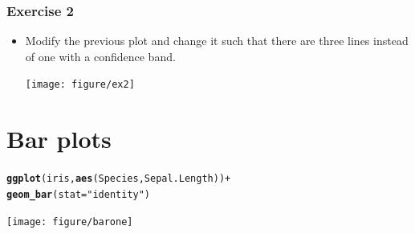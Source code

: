 \documentclass{beamer}\usepackage[]{graphicx}\usepackage[]{color}
\makeatletter
\newcommand{\hlstr}[1]{\textcolor[rgb]{0.192,0.494,0.8}{#1}}%
\newcommand{\hlopt}[1]{\textcolor[rgb]{0,0,0}{#1}}%
\newcommand{\hlstd}[1]{\textcolor[rgb]{0.345,0.345,0.345}{#1}}%
\newcommand{\hlkwc}[1]{\textcolor[rgb]{0.333,0.667,0.333}{#1}}%
\newcommand{\hlkwd}[1]{\textcolor[rgb]{0.737,0.353,0.396}{\textbf{#1}}}%
\newenvironment{kframe}{%
 \def\at@end@of@kframe{}%
 \ifinner\ifhmode%
  \def\at@end@of@kframe{\end{minipage}}%
  \begin{minipage}{\columnwidth}%
 \fi\fi%
 \def\FrameCommand##1{\hskip\@totalleftmargin \hskip-\fboxsep
 \colorbox{shadecolor}{##1}\hskip-\fboxsep
     \hskip-\linewidth \hskip-\@totalleftmargin \hskip\columnwidth}%
 \MakeFramed {\advance\hsize-\width
   \@totalleftmargin\z@ \linewidth\hsize
   \@setminipage}}%
 {\par\unskip\endMakeFramed%
 \at@end@of@kframe}
\newenvironment{knitrout}{}{} %
\makeatother
\begin{document}

\begin{frame}[fragile]
\frametitle{Exercise 2}
\begin{itemize}
\item Modify the previous plot and change it such that there are three lines instead of one with a confidence band.
\begin{knitrout}\footnotesize
{}\color{fgcolor}

{\centering \texttt{[image: figure/ex2]} 

}



\end{knitrout}

\end{itemize}
\end{frame}


\section*{Bar plots}
\frame{\sectionpage}


\begin{frame}[fragile]
\begin{knitrout}\footnotesize
{}\color{fgcolor}\begin{kframe}
\begin{alltt}
\hlkwd{ggplot}\hlstd{(iris,} \hlkwd{aes}\hlstd{(Species, Sepal.Length))} \hlopt{+}
\hlkwd{geom_bar}\hlstd{(}\hlkwc{stat} \hlstd{=} \hlstr{"identity"}\hlstd{)}
\end{alltt}
\end{kframe}

{\centering \texttt{[image: figure/barone]} 

}



\end{knitrout}
\end{frame}

\end{document}
